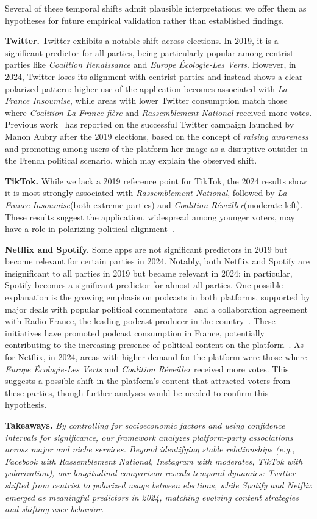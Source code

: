 \documentclass[9pt,sigconf,letterpaper]{acmart}
\newcommand{\eg}{\textit{e.g.},\xspace}
\newcommand{\RN}{\textsl{Rassemblement National}\xspace}
\newcommand{\RENA}{\textsl{Coalition Renaissance}\xspace}
\newcommand{\EEC}{\textsl{Europe Écologie-Les Verts}\xspace}
\newcommand{\LFI}{\textsl{La France Insoumise}\xspace}
\newcommand{\REVE}{\textsl{Coalition Réveiller}\xspace}
\newcommand{\LFF}{\textsl{Coalition La France fière}\xspace}
\begin{document}
Several of these temporal shifts admit plausible interpretations; we offer them as hypotheses for future empirical validation rather than established findings.

\noindent\textbf{Twitter.}
Twitter exhibits a notable shift across elections. In 2019, it is a significant predictor for all parties, being particularly popular among centrist parties like \RENA and \EEC. 
However, in 2024, Twitter loses its alignment with centrist parties and instead shows a clear polarized pattern: higher use of the application becomes associated with \LFI, while areas with lower Twitter consumption match those where \LFF and \RN received more votes. 
Previous work~\cite{haapala2023disrupting} has reported on the successful Twitter campaign launched by Manon Aubry after the 2019 elections, based on the concept of \textit{raising awareness} and promoting among users of the platform her image as a disruptive outsider in the French political scenario, which may explain the observed shift.

\noindent\textbf{TikTok.} 
While we lack a 2019 reference point for TikTok, the 2024 results show it is most strongly associated with \RN, followed by \LFI (both extreme parties) and \REVE (moderate-left). These results suggest the application, widespread among younger voters, may have a role in polarizing political alignment~\cite{cartes2025attracting, algan2025fievre}.

\noindent\textbf{Netflix and Spotify.} 
Some apps are not significant predictors in 2019 but become relevant for certain parties in 2024. 
Notably, both Netflix and Spotify are insignificant to all parties in 2019 but became relevant in 2024; in particular, Spotify becomes a significant predictor for almost all parties. 
One possible explanation is the growing emphasis on podcasts in both platforms, supported by major deals with popular political commentators~\cite{spotify_joe_rogan} and a collaboration agreement with Radio France, the leading podcast producer in the country~\cite{spotify_radio_france}. 
These initiatives have promoted podcast consumption in France, potentially contributing to the increasing presence of political content on the platform~\cite{buschow2022spotify}.
As for Netflix, in 2024, areas with higher demand for the platform were those where \EEC and \REVE received more votes. 
This suggests a possible shift in the platform's content that attracted voters from these parties, though further analyses would be needed to confirm this hypothesis.


\noindent\textbf{Takeaways.}
\textit{By controlling for socioeconomic factors and using confidence intervals for significance, our framework analyzes platform-party associations across major and niche services. Beyond identifying stable relationships (\eg Facebook with \RN, Instagram with moderates, TikTok with polarization), our longitudinal comparison reveals temporal dynamics: Twitter shifted from centrist to polarized usage between elections, while Spotify and Netflix emerged as meaningful predictors in 2024, matching evolving content strategies and shifting user behavior.}
\end{document}
